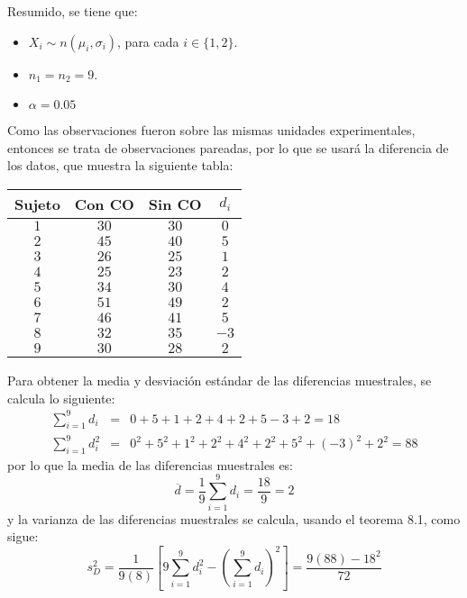 \begin{solucion}
 \begin{datos}
  Resumido, se tiene que:
  \begin{itemize}
   \item $X_i \sim n\left( \mu_i, \sigma_i \right)$,
   para cada $i \in \{ 1,2 \}$.
   \item $n_1 = n_2 = 9$.
   \item $\alpha = 0.05$
  \end{itemize}
  Como las observaciones fueron sobre las mismas unidades experimentales,
  entonces se trata de observaciones pareadas,
  por lo que se usar\'a la diferencia de los datos, que muestra la siguiente tabla:
  \begin{center}
   \begin{tabular}{cccc}
    \textbf{Sujeto} & \textbf{Con CO} & \textbf{Sin CO} & $d_i$ \\
    \hline 
    $1$ & $30$ & $30$ & $0$ \\
    $2$ & $45$ & $40$ & $5$ \\
    $3$ & $26$ & $25$ & $1$ \\
    $4$ & $25$ & $23$ & $2$ \\
    $5$ & $34$ & $30$ & $4$ \\
    $6$ & $51$ & $49$ & $2$ \\
    $7$ & $46$ & $41$ & $5$ \\
    $8$ & $32$ & $35$ & $-3$ \\
    $9$ & $30$ & $28$ & $2$
   \end{tabular}
  \end{center}
  Para obtener la media y desviaci\'on est\'andar
  de las diferencias muestrales, se calcula lo siguiente:
  \begin{eqnarray*}
   \sum_{i=1}^9 d_i & = &
   0 + 5 + 1 + 2 + 4 + 2+ 5 - 3 + 2 = 18
   \\
   \sum_{i=1}^9 d_i^2 & = &
   0^2 + 5^2 + 1^2 + 2^2 + 4^2 + 2^2 + 5^2 + (-3)^2 + 2^2 = 88
  \end{eqnarray*}
  por lo que la media de las diferencias muestrales es:
  \begin{equation*}
   \overline{d} = \frac{1}{9} \sum_{i=1}^9 d_i = \frac{18}{9} = 2
  \end{equation*}
  y la varianza de las diferencias muestrales se calcula, usando el teorema 8.1,
  como sigue:
  \begin{equation*}
   s_D^2 = \frac{1}{9(8)}
   \left[ 
   9 \sum_{i=1}^9 d_i^2 - \left( \sum_{i=1}^9 d_i \right)^2
   \right]
   = \frac{9(88) - 18^2}{72}

\end{equation*}
\end{datos}
\end{solucion}
